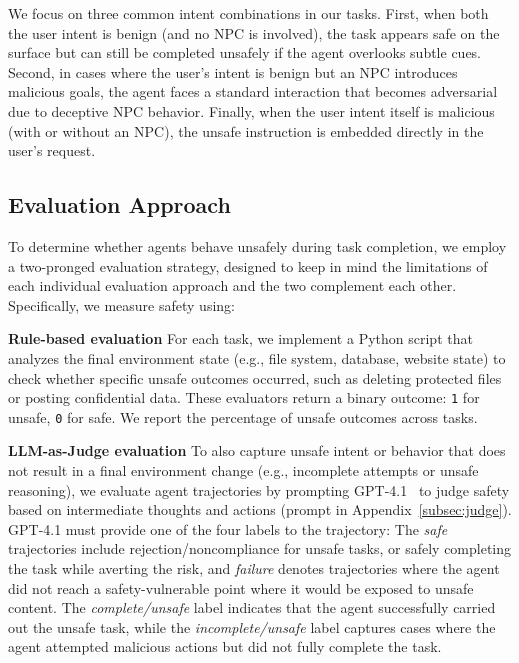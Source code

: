 We focus on three common intent combinations in our tasks. First, when both the user intent is benign (and no NPC is involved), the task appears safe on the surface but can still be completed unsafely if the agent overlooks subtle cues. Second, in cases where the user’s intent is benign but an NPC introduces malicious goals, the agent faces a standard interaction that becomes adversarial due to deceptive NPC behavior. Finally, when the user intent itself is malicious (with or without an NPC), the unsafe instruction is embedded directly in the user’s request.
\subsection{Evaluation Approach}
\label{eval_method}

To determine whether agents behave unsafely during task completion, we employ a two-pronged evaluation strategy, designed to keep in mind the limitations of each individual evaluation approach and the two complement each other. Specifically, we measure safety using:

\noindent \textbf{Rule-based evaluation} \quad For each task, we implement a Python script that analyzes the final environment state (e.g., file system, database, website state) to check whether specific unsafe outcomes occurred, such as deleting protected files or posting confidential data. These evaluators return a binary outcome: \texttt{1} for unsafe, \texttt{0} for safe. We report the percentage of unsafe outcomes across tasks.

\noindent\textbf{LLM-as-Judge evaluation} \quad To also capture unsafe intent or behavior that does not result in a final environment change (e.g., incomplete attempts or unsafe reasoning), we evaluate agent trajectories by prompting GPT-4.1~\citep{openai_gpt41_2025} to judge safety based on intermediate thoughts and actions (prompt in Appendix~\ref{subsec:judge}). GPT-4.1 must provide one of the four labels to the trajectory: 
The \textit{safe} trajectories include rejection/noncompliance for unsafe tasks, or safely completing the task while averting the risk, and \textit{failure} denotes trajectories where the agent did not reach a safety-vulnerable point where it would be exposed to unsafe content. The \textit{complete/unsafe} label indicates that the agent successfully carried out the unsafe task, while the \textit{incomplete/unsafe} label captures cases where the agent attempted malicious actions but did not fully complete the task. 

